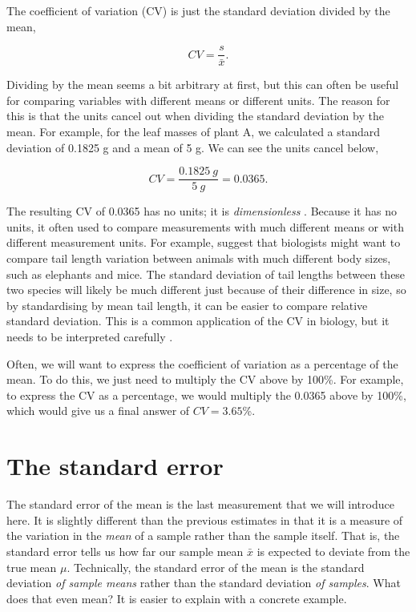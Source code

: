 \documentclass[
  openany]{scrbook}
\begin{document}
The coefficient of variation (CV) is just the standard deviation divided by the mean,

\[CV = \frac{s}{\bar{x}}.\]

Dividing by the mean seems a bit arbitrary at first, but this can often be useful for comparing variables with different means or different units.
The reason for this is that the units cancel out when dividing the standard deviation by the mean.
For example, for the leaf masses of plant A, we calculated a standard deviation of 0.1825 g and a mean of 5 g.
We can see the units cancel below,

\[CV = \frac{0.1825\:g}{5\:g} = 0.0365.\]

The resulting CV of 0.0365 has no units; it is \emph{dimensionless} \citep{Lande1977}.
Because it has no units, it often used to compare measurements with much different means or with different measurement units.
For example, \citet{Sokal1995} suggest that biologists might want to compare tail length variation between animals with much different body sizes, such as elephants and mice.
The standard deviation of tail lengths between these two species will likely be much different just because of their difference in size, so by standardising by mean tail length, it can be easier to compare relative standard deviation.
This is a common application of the CV in biology, but it needs to be interpreted carefully \citep{Pelabon2020}.

Often, we will want to express the coefficient of variation as a percentage of the mean.
To do this, we just need to multiply the CV above by 100\%.
For example, to express the CV as a percentage, we would multiply the 0.0365 above by 100\%, which would give us a final answer of \(CV = 3.65\)\%.

\hypertarget{the-standard-error}{%
\section{The standard error}\label{the-standard-error}}

The standard error of the mean is the last measurement that we will introduce here.
It is slightly different than the previous estimates in that it is a measure of the variation in the \emph{mean} of a sample rather than the sample itself.
That is, the standard error tells us how far our sample mean \(\bar{x}\) is expected to deviate from the true mean \(\mu\).
Technically, the standard error of the mean is the standard deviation \emph{of sample means} rather than the standard deviation \emph{of samples}.
What does that even mean?
It is easier to explain with a concrete example.
\end{document}
